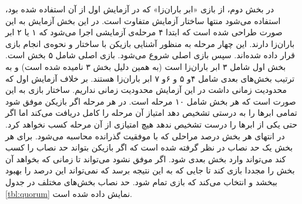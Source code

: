 \documentclass[twoside, a4paper,11pt]{book}
\numberwithin{equation}{chapter}
\numberwithin{table}{chapter}
\numberwithin{figure}{chapter}
\numberwithin{equation}{chapter}
\begin{document}
در بخش دوم، از بازی «ابر باران‌زا» که در آزمایش اول از آن استفاده شده بود، استفاده می‌شود منتها ساختار آزمایش متفاوت است. در این بخش آزمایش به این صورت طراحی شده است که ابتدا ۴ مرحله‌ی آزمایشی اجرا می‌شود که ۱ یا ۲ ابر باران‌زا دارند. این چهار مرحله به منظور آشنایی بازیکن با ساختار و نحوه‌ی انجام بازی قرار داده شده‌اند. سپس بازی اصلی شروع می‌شود. بازی اصلی شامل ۵ بخش است. بخش اول شامل ۳ ابر باران‌زا است (به همین دلیل بخش ۳ نامیده شده است) و به ترتیب بخش‌های بعدی شامل ۴و ۵ و ۶و ۷ ابر باران‌زا هستند. بر خلاف آزمایش اول که محدودیت زمانی داشت در این آزمایش محدودیت زمانی نداریم. ساختار بازی به این صورت است که هر بخش شامل ۱۰ مرحله است. در هر مرحله اگر بازیکن موفق شود تمامی ابرها را به درستی تشخیص دهد امتیاز آن مرحله را کامل دریافت می‌کند اما اگر حتی یکی از ابرها را درست تشخیص ندهد هیچ امتیازی از آن مرحله کسب نخواهد کرد. در انتهای هر بخش درصد مراحلی که با موفقیت گذرانده محاسبه می‌شود. برای هر بخش یک حد نصاب در نظر گرفته شده است که اگر بازیکن بتواند حد نصاب را کسب کند می‌تواند وارد بخش بعدی شود. اگر موفق نشود می‌تواند تا زمانی که بخواهد آن بخش را مجددا بازی کند تا جایی که به این نتیجه برسد که نمی‌تواند این درصد را بهبود ببخشد و انتخاب می‌کند که بازی تمام شود. حد نصاب بخش‌های مختلف در جدول \ref{tbl:quorum} نمایش داده شده است. 

\begin{table}[]
\end{table}
\end{document}
